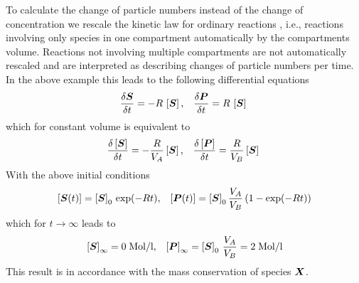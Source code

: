 \documentclass[12pt,english]{article}
\newcommand{\boldsymbol}[1]{\mbox{\boldmath $#1$}}
\begin{document}
To calculate the change of particle numbers instead of the change of
concentration we rescale the kinetic law for ordinary reactions ,
i.e., reactions involving only species in one compartment
automatically by the compartments volume. Reactions not involving
multiple compartments are not automatically rescaled and are
interpreted as describing changes of particle numbers per time. In the
above example this leads to the following differential equations
%
\begin{eqnarray}
\frac{\delta \boldsymbol{S}}{\delta t} 
= - R\, \left[\boldsymbol{S}\right]
\mbox{,} &&
\frac{\delta \boldsymbol{P}}{\delta t} 
=   R\, \left[\boldsymbol{S}\right] \
\end{eqnarray} 
%
which for constant volume is equivalent to
%
\hypertarget{COPASI_1}{
\begin{eqnarray}\label{COPASI_1}
\frac{\delta \left[\boldsymbol{S}\right]}{\delta t} 
= - \frac{R}{V_A} \left[\boldsymbol{S}\right]
\mbox{,} &&
\frac{\delta \left[\boldsymbol{P}\right]}{\delta t} 
=   \frac{R}{V_B} \left[\boldsymbol{S}\right] \
\end{eqnarray} 
}
%
With the above initial conditions
%
\begin{eqnarray}
\left[\boldsymbol{S}(t)\right] = \left[\boldsymbol{S}\right]_0 \, \exp(-Rt) 
\mbox{,} &&
\left[\boldsymbol{P}(t)\right] = \left[\boldsymbol{S}\right]_0 
\frac{V_A}{V_B}\, (1 - \exp(-Rt))
\end{eqnarray} 
%
which for $t \rightarrow \infty$ leads to 
%
\begin{eqnarray}
\left[\boldsymbol{S}\right]_\infty = 0\; \mbox{Mol/l}
\mbox{,} &&
\left[\boldsymbol{P}\right]_\infty
 = \left[\boldsymbol{S}\right]_0\, \frac{V_A}{V_B}
 = 2\; \mbox{Mol/l} 
\end{eqnarray} 
%
This result is in accordance with the mass conservation of species
$\boldsymbol{X}$.
\end{document}

